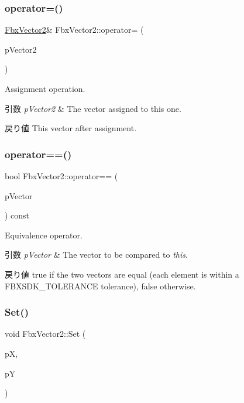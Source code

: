 \subsubsection{\texorpdfstring{operator=()}{operator=()}}
{\footnotesize\ttfamily \hyperlink{class_fbx_vector2}{Fbx\+Vector2}\& Fbx\+Vector2\+::operator= (\begin{DoxyParamCaption}\item[{const \hyperlink{class_fbx_vector2}{Fbx\+Vector2} \&}]{p\+Vector2 }\end{DoxyParamCaption})}

Assignment operation. 
\begin{DoxyParams}{引数}
{\em p\+Vector2} & The vector assigned to this one. \\
\hline
\end{DoxyParams}
\begin{DoxyReturn}{戻り値}
This vector after assignment. 
\end{DoxyReturn}
\mbox{\label{class_fbx_vector2_a4196aa8199019d572c3b01c1521778d5}} 
\subsubsection{\texorpdfstring{operator==()}{operator==()}}
{\footnotesize\ttfamily bool Fbx\+Vector2\+::operator== (\begin{DoxyParamCaption}\item[{const \hyperlink{class_fbx_vector2}{Fbx\+Vector2} \&}]{p\+Vector }\end{DoxyParamCaption}) const}

Equivalence operator. 
\begin{DoxyParams}{引数}
{\em p\+Vector} & The vector to be compared to {\itshape this}. \\
\hline
\end{DoxyParams}
\begin{DoxyReturn}{戻り値}
{\ttfamily true} if the two vectors are equal (each element is within a F\+B\+X\+S\+D\+K\+\_\+\+T\+O\+L\+E\+R\+A\+N\+CE tolerance), {\ttfamily false} otherwise. 
\end{DoxyReturn}
\mbox{\label{class_fbx_vector2_a3a28093a354342dcf424cab26f732a57}} 
\subsubsection{\texorpdfstring{Set()}{Set()}}
{\footnotesize\ttfamily void Fbx\+Vector2\+::\+Set (\begin{DoxyParamCaption}\item[{double}]{pX,  }\item[{double}]{pY }\end{DoxyParamCaption})}

